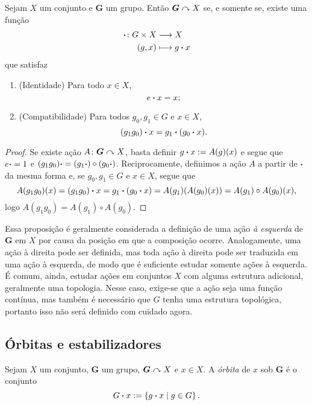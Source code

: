\begin{proposition}
Sejam $X$ um conjunto e $\bm G$ um grupo. Então $\bm G \curvearrowright X$ se, e somente se, existe uma função
	\begin{align*}
	{\bm{\cdot}}\colon {G \times X} &\longrightarrow {X} \\{(g,x)} &\longmapsto g\bm{\cdot} x
	\end{align*}
que satisfaz
\begin{enumerate}
\item (Identidade) Para todo $x \in X$,
	\begin{equation*}
	e \bm{\cdot} x = x;
	\end{equation*}
\item (Compatibilidade) Para todos $g_0,g_1 \in G$ e $x \in X$,
	\begin{equation*}
	(g_1g_0) \bm{\cdot} x = g_1 \bm{\cdot} (g_0 \bm{\cdot} x).
	\end{equation*}
\end{enumerate}
\end{proposition}
\begin{proof}
Se existe ação ${A}\colon {\bm G} \curvearrowright {X}$, basta definir $g \bm{\cdot} x := A(g)(x)$ e segue que $e\bm{\cdot} = 1$ e $(g_1g_0) \bm{\cdot} = (g_1 \bm{\cdot}) \circ (g_0 \bm{\cdot})$. Reciprocamente, definimos a ação $A$ a partir de $\bm{\cdot}$ da mesma forma e, se $g_0,g_1 \in G$ e $x \in X$, segue que
	\begin{equation*}
	A(g_1g_0)(x) =(g_1g_0) \bm{\cdot} x = g_1 \bm{\cdot} (g_0 \bm{\cdot} x) = A(g_1)(A(g_0)(x)) = A(g_1) \circ A(g_0)(x),
	\end{equation*}
logo $A(g_1g_0)=A(g_1) \circ A(g_0)$.
\end{proof}

Essa proposição é geralmente considerada a definição de uma ação \emph{à esquerda} de $\bm G$ em $X$ por causa da posição em que a composição ocorre. Analogamente, uma ação à direita pode ser definida, mas toda ação à direita pode ser traduzida em uma ação à esquerda, de modo que é suficiente estudar somente ações à esquerda. É comum, ainda, estudar ações em conjuntos $X$ com alguma estrutura adicional, geralmente uma topologia. Nesse caso, exige-se que a ação seja uma função contínua, mas também é necessário que $G$ tenha uma estrutura topológica, portanto isso não será definido com cuidado agora.

\subsection{Órbitas e estabilizadores}

\begin{definition}
Sejam $X$ um conjunto, $\bm G$ um grupo, $\bm G \curvearrowright X$ e $x \in X$. A \emph{órbita} de $x$ sob $\bm G$ é o conjunto
	\begin{equation*}
	G \bm{\cdot} x := \left\{{g\bm{\cdot} x}\;\middle\vert\;{g \in G}\right\}.
	\end{equation*}
\end{definition}

